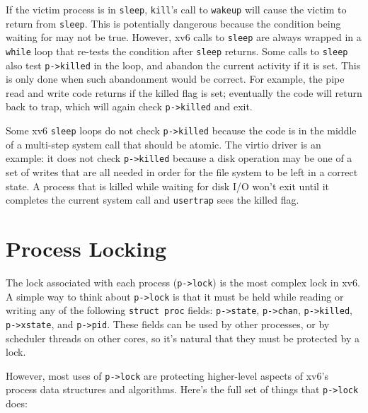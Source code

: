 If the victim process is in
\lstinline{sleep},
\lstinline{kill}'s call to
\lstinline{wakeup}
will cause the victim to return from
\lstinline{sleep}.
This is potentially dangerous because 
the condition being waiting for may not be true.
However, xv6 calls to
\lstinline{sleep}
are always wrapped in a
\lstinline{while}
loop that re-tests the condition after
\lstinline{sleep}
returns.
Some calls to
\lstinline{sleep}
also test
\lstinline{p->killed}
in the loop, and abandon the current activity if it is set.
This is only done when such abandonment would be correct.
For example, the pipe read and write code
returns if the killed flag is set; eventually the
code will return back to trap, which will again
check \lstinline{p->killed} and exit.

Some xv6 
\lstinline{sleep}
loops do not check
\lstinline{p->killed} 
because the code is in the middle of a multi-step
system call that should be atomic.
The virtio driver
is an example: it does not check
\lstinline{p->killed}
because a disk operation may be one of a set of
writes that are all needed in order for the file system to
be left in a correct state.
A process that is killed while waiting for disk I/O won't
exit until it completes the current system call and
\lstinline{usertrap} sees the killed flag.

\section{Process Locking}

The lock associated with each process (\lstinline{p->lock}) is the
most complex lock in xv6.
A simple way to think about \lstinline{p->lock} is
that it must be held while reading or writing any of the following
\lstinline{struct proc} fields:
\lstinline{p->state},
\lstinline{p->chan},
\lstinline{p->killed},
\lstinline{p->xstate},
and
\lstinline{p->pid}.
These fields can be used by other processes, or by scheduler
threads on other cores, so it's natural that they
must be protected by a lock.

However, most uses of \lstinline{p->lock} are protecting higher-level
aspects of xv6's process data structures and algorithms. Here's
the full set of things that \lstinline{p->lock} does:


